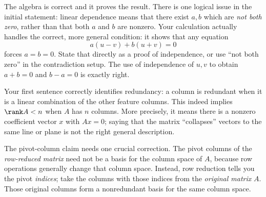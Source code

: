 \begin{feedback}[\cref{ex:la-5}]
The algebra is correct and it proves the result.  There is one logical issue in the initial statement: linear dependence means that there exist $a,b$ which are \emph{not both zero}, rather than that both $a$ and $b$ are nonzero.  Your calculation actually handles the correct, more general condition: it shows that any equation
\[
  a(u-v)+b(u+v)=0
\]
forces $a=b=0$.  State that directly as a proof of independence, or use ``not both zero'' in the contradiction setup.  The use of independence of $u,v$ to obtain $a+b=0$ and $b-a=0$ is exactly right.
\end{feedback}

\begin{feedback}[\cref{ex:la-6}]
Your first sentence correctly identifies redundancy: a column is redundant when it is a linear combination of the other feature columns.  This indeed implies $\rank A<n$ when $A$ has $n$ columns.  More precisely, it means there is a nonzero coefficient vector $x$ with $Ax=0$; saying that the matrix ``collapses'' vectors to the same line or plane is not the right general description.

The pivot-column claim needs one crucial correction.  The pivot columns of the \emph{row-reduced matrix} need not be a basis for the column space of $A$, because row operations generally change that column space.  Instead, row reduction tells you the pivot \emph{indices}; take the columns with those indices from the \emph{original matrix} $A$.  Those original columns form a nonredundant basis for the same column space.
\end{feedback}

